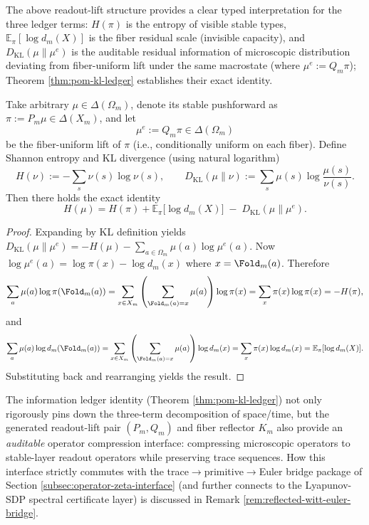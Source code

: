 The above readout-lift structure provides a clear typed interpretation for the three ledger terms: $H(\pi)$ is the entropy of visible stable types, $\mathbb{E}_{\pi}[\log d_m(X)]$ is the fiber residual scale (invisible capacity), and $D_{\mathrm{KL}}(\mu\|\mu^{e})$ is the auditable residual information of microscopic distribution deviating from fiber-uniform lift under the same macrostate (where $\mu^{e}:=Q_m\pi$); Theorem \ref{thm:pom-kl-ledger} establishes their exact identity.

\begin{theorem}\label{thm:pom-kl-ledger}
Take arbitrary $\mu\in\Delta(\Omega_m)$, denote its stable pushforward as $\pi:=P_m\mu\in\Delta(X_m)$, and let
\[
\mu^{e}:=Q_m\pi\in\Delta(\Omega_m)
\]
be the fiber-uniform lift of $\pi$ (i.e., conditionally uniform on each fiber).
Define Shannon entropy and KL divergence (using natural logarithm)
\[
H(\nu):=-\sum_{s}\nu(s)\log\nu(s),
\qquad
D_{\mathrm{KL}}(\mu\|\nu):=\sum_{s}\mu(s)\log\frac{\mu(s)}{\nu(s)}.
\]
Then there holds the exact identity
\[
\boxed{\;
H(\mu)=H(\pi)+\mathbb{E}_{\pi}\!\bigl[\log d_m(X)\bigr]\;-\;D_{\mathrm{KL}}(\mu\|\mu^{e}).
\;}
\]
\end{theorem}
\begin{proof}
Expanding by KL definition yields
\(
D_{\mathrm{KL}}(\mu\|\mu^{e})=-H(\mu)-\sum_{a\in\Omega_m}\mu(a)\log\mu^{e}(a)
\).
Now
\(
\log\mu^{e}(a)=\log\pi(x)-\log d_m(x)
\)
where $x=\Fold_m(a)$.
Therefore
\[
\sum_{a}\mu(a)\log\pi(\Fold_m(a))
=\sum_{x\in X_m}\left(\sum_{\Fold_m(a)=x}\mu(a)\right)\log\pi(x)
=\sum_{x}\pi(x)\log\pi(x)
=-H(\pi),
\]
and
\[
\sum_{a}\mu(a)\log d_m(\Fold_m(a))
=\sum_{x\in X_m}\left(\sum_{\Fold_m(a)=x}\mu(a)\right)\log d_m(x)
=\sum_{x}\pi(x)\log d_m(x)
=\mathbb{E}_{\pi}[\log d_m(X)].
\]
Substituting back and rearranging yields the result.
\end{proof}

\begin{remark}\label{rem:pom-ledger-glue-zeta}
The information ledger identity (Theorem \ref{thm:pom-kl-ledger}) not only rigorously pins down the three-term decomposition of space/time,
but the generated readout-lift pair \((P_m,Q_m)\) and fiber reflector \(K_m\) also provide an \emph{auditable} operator compression interface: compressing microscopic operators to stable-layer readout operators while preserving trace sequences.
How this interface strictly commutes with the trace$\to$primitive$\to$Euler bridge package of Section \ref{subsec:operator-zeta-interface} (and further connects to the Lyapunov-SDP spectral certificate layer) is discussed in Remark \ref{rem:reflected-witt-euler-bridge}.
\end{remark}

